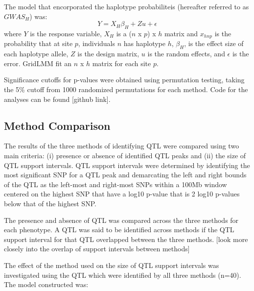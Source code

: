 \documentclass[article,9pt,twocolumn,twoside]{rilabRxiv}
\begin{document}
The model that encorporated the haplotype probabiliteis (hereafter referred to as $GWAS_H$) was:
\begin{equation}
\label{eqn:gridlmm3}
 Y = X_H{\beta_H} + Zu + \epsilon
\end{equation}
where $Y$ is the response variable, $X_H$ is a ($n$ x $p$) x $h$ matrix and $x_{hnp}$ is the probability that at site $p$, individuals $n$ has haplotype $h$, $\beta_H$, is the effect size of each haplotype allele, $Z$ is the design matrix, $u$ is the random effects, and $\epsilon$ is the error. GridLMM fit an $n$ x $h$ matrix for each site $p$.

 Significance cutoffs for p-values were obtained using permutation testing, taking the 5\% cutoff from 1000 randomized permutations for each method. Code for the analyses can be found [github link].

\subsection{Method Comparison}
The results of the three methods of identifying QTL were compared using two main criteria: (i) presence or absence of identified QTL peaks and (ii) the size of QTL support intervals. %
QTL support intervals were determined by identifying the most significant SNP for a QTL peak and demarcating the left and right bounds of the QTL as the left-most and right-most SNPs within a 100Mb window centered on the highest SNP that have a log10 p-value that is 2 log10 p-values below that of the highest SNP.

The presence and absence of QTL was compared across the three methods for each phenotype. A QTL was said to be identified across methods if the QTL support interval for that QTL overlapped between the three methods. [look more closely into the overlap of support intervals between methods]

The effect of the method used on the size of QTL support intervals was investigated using the QTL which were identified by all three methods (n=40). The model constructed was:
\end{document}
